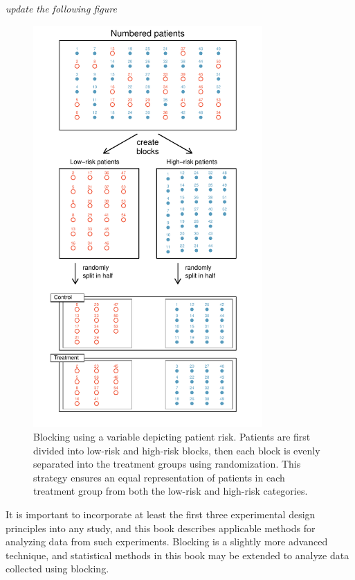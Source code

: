 \begin{doublespace}
\begin{description}
\end{description}

\textsl{update the following figure}

	\begin{figure}
		\centering
		\includegraphics[width=0.78\textwidth]{ch_intro_to_data_oi_biostat/figures/figureShowingBlocking/figureShowingBlocking}
		\caption{Blocking using a variable depicting patient risk. Patients are first divided into low-risk and high-risk blocks, then each block is evenly separated into the treatment groups using randomization. This strategy ensures an equal representation of patients in each treatment group from both the low-risk and high-risk categories.}
		\label{figureShowingBlocking}
	\end{figure}
	

It is important to incorporate at least the first three experimental design principles into any study, and this book describes applicable methods for analyzing data from such experiments. Blocking is a slightly more advanced technique, and statistical methods in this book may be extended to analyze data collected using blocking.




\end{doublespace}
